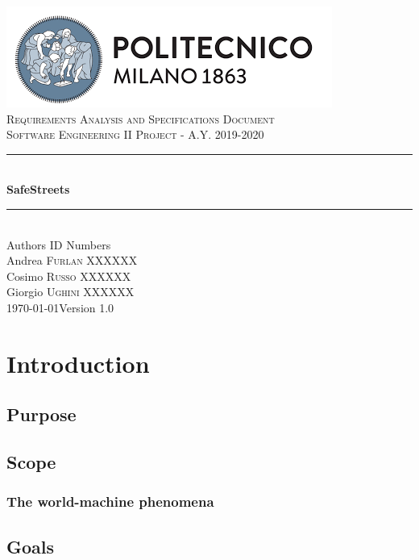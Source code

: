 \documentclass[12pt]{article}
\begin{document}
	\begin{titlepage}
		\newcommand{\HRule}{\rule{\linewidth}{0.7mm}}
		\center
		\includegraphics{PolimiLogo.png}\\[1cm]
		
		\textsc{\LARGE Requirements Analysis and Specifications Document}\\[1cm]
		\textsc{\large Software Engineering II Project - A.Y. 2019-2020}\\[1cm]
		\HRule \\[0.4cm]
		{ \huge \bfseries SafeStreets}\\[0.15cm]
		\HRule \\[1.5cm]
		{\large Authors  \hfill ID Numbers}\\[0.4cm]
		{\large Andrea \textsc{Furlan}  \hfill XXXXXX}\\[0.2cm]
		{\large Cosimo \textsc{Russo}  \hfill XXXXXX}\\[0.2cm]
		{\large Giorgio \textsc{Ughini} \hfill XXXXXX}\\[2cm]
		{\large \today  \hfill Version 1.0}
		\vfill
	\end{titlepage}
	\clearpage
	{\hypersetup{hidelinks}\tableofcontents}
	\clearpage
	\section{Introduction}
	\subsection{Purpose}
	
	\newpage
	\subsection{Scope}
	
	\subsubsection{The world-machine phenomena}
	
	\clearpage
	\subsection{Goals}
	
\end{document}
